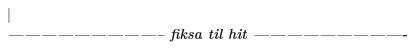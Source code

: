

	



	
	

| \\ \emph{\bf\large{{----------------------------- fiksa til hit ----------------------------}}}\\




